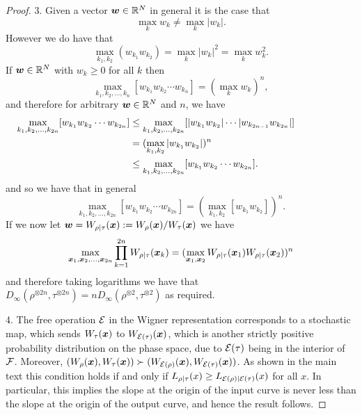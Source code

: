 \documentclass[pra,
aps,
twocolumn,
superscriptaddress,
groupedaddress,
nofootinbib,
reprint
]{revtex4-1}
\begin{document}
\begin{proof}
3. Given a vector $\boldsymbol{w} \in \mathbb{R}^N$ in general it is the case that
\begin{equation}
\max_k w_k \ne \max_k |w_k|.
\end{equation}
However we do have that
\begin{equation}
\max_{k_1,k_2} (w_{k_1} w_{k_2}) = \max_k |w_k|^2 = \max_k w_k^2.
\end{equation}
If $\boldsymbol{w} \in \mathbb{R}^N$ with $w_k \ge 0$ for all $k$ then
\begin{equation}
\max_{k_1, k_2, \dots, k_n} [ w_{k_1}w_{k_2}\cdots w_{k_n}] = (\max_k w_k)^n,
\end{equation}
and therefore for arbitrary $\boldsymbol{w} \in \mathbb{R}^N$ and $n$, we have
\begin{align}
\hspace{-1.8cm}\max_{k_1, k_2, \dots, k_{2n}} [ w_{k_1}w_{k_2}\cdots w_{k_{2n}}] &\le \max_{k_1, k_2, \dots, k_{2n}}[|w_{k_1}w_{k_2}|\cdots |w_{k_{2n-1}} w_{k_{2n}}|] \nonumber \\
&=(\max_{k_1 ,k_2} |w_{k_1} w_{k_2}| )^n \nonumber \\
&\le\max_{k_1, k_2, \dots, k_{2n}} [ w_{k_1}w_{k_2}\cdots w_{k_{2n}}]  .
\end{align}
and so we have that in general
\begin{equation}
\max_{k_1, k_2, \dots, k_{2n}} [ w_{k_1}w_{k_2}\cdots w_{k_{2n}}]  =  (\max_{k_1 ,k_2} [w_{k_1} w_{k_2}] )^n.
\end{equation}
If we now let $\boldsymbol{w} = W_{\rho|\tau}(\boldsymbol{x}) := W_{\rho}(\boldsymbol{x}) /W_{\tau}(\boldsymbol{x})$ we have
\begin{equation}
\max_{\boldsymbol{x}_1, \boldsymbol{x}_2, \dots ,\boldsymbol{x}_{2n}} \prod_{k=1}^{2n} W_{\rho|\tau}(\boldsymbol{x}_k) = (\max_{\boldsymbol{x}_1, \boldsymbol{x}_2} W_{\rho|\tau}(\boldsymbol{x}_1)W_{\rho|\tau}(\boldsymbol{x}_2))^n
\end{equation}
and therefore taking logarithms we have that $D_\infty (\rho^{\otimes 2n}, \tau^{\otimes 2n}) = n D_\infty(\rho^{\otimes 2} ,\tau^{\otimes 2})$ as required. 

4. The free operation ${\mathcal E}$ in the Wigner representation corresponds to a stochastic map, which sends $W_\tau(\boldsymbol{x})$ to $W_{{\mathcal E}(\tau)}(\boldsymbol{x})$, which is another strictly positive probability distribution on the phase space, due to ${\mathcal E}(\tau)$ being in the interior of ${\mathcal F}$. Moreover, $(W_\rho(\boldsymbol{x}), W_\tau(\boldsymbol{x}) ) \succ (W_{{\mathcal E}(\rho)}(\boldsymbol{x}) , W_{{\mathcal E}(\tau)}(\boldsymbol{x}))$. As shown in the main text this condition holds if and only if $L_{\rho|\tau}(x) \ge L_{{\mathcal E}(\rho)|{\mathcal E}(\tau)}(x)$ for all $x$. In particular, this implies the slope at the origin of the input curve is never less than the slope at the origin of the output curve, and hence the result follows.
\end{proof}
\end{document}
